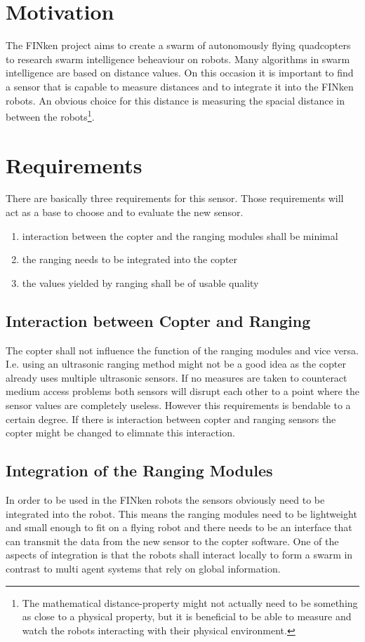 \section{Motivation}

The FINken project aims to create a swarm of autonomously flying quadcopters to research swarm intelligence beheaviour on robots.
Many algorithms in swarm intelligence are based on distance values. 
On this occasion it is important to find a sensor that is capable to measure distances and to integrate it into the FINken robots.
An obvious choice for this distance is measuring the spacial distance in between the robots\footnote{
The mathematical distance-property might not actually need to be something as close to a physical property, but it is beneficial to be able to measure and watch the robots interacting with their physical environment.}.

\section{Requirements}
\label{req}
There are basically three requirements for this sensor. 
Those requirements will act as a base to choose and to evaluate the new sensor.

\begin{enumerate}
	\item interaction between the copter and the ranging modules shall be minimal
	\item the ranging needs to be integrated into the copter
	\item the values yielded by ranging shall be of usable quality
\end{enumerate}

\subsection{Interaction between Copter and Ranging}
\label{req1}
The copter shall not influence the function of the ranging modules and vice versa.
I.e. using an ultrasonic ranging method might not be a good idea as the copter already uses multiple ultrasonic sensors.
If no measures are taken to counteract medium access problems both sensors will disrupt each other to a point where the sensor values are completely useless.
However this requirements is bendable to a certain degree.
If there is interaction between copter and ranging sensors the copter might be changed to elimnate this interaction.

\subsection{Integration of the Ranging Modules}
\label{req2}
In order to be used in the FINken robots the sensors obviously need to be integrated into the robot.
This means the ranging modules need to be lightweight and small enough to fit on a flying robot and there needs to be an interface that can transmit the data from the new sensor to the copter software.
One of the aspects of integration is that the robots shall interact locally to form a swarm in contrast to multi agent systems that rely on global information.

